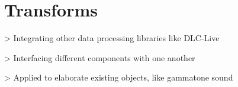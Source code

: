 \section{Transforms}
\label{sec:transforms}

> Integrating other data processing libraries like DLC-Live

> Interfacing different components with one another

> Applied to elaborate existing objects, like gammatone sound